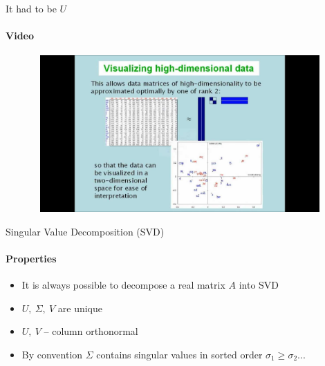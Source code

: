 \documentclass[aspectratio=169]{beamer}
\begin{document}
\begin{frame}[t]{It had to be $U$}  
    \framesubtitle{Video}
    \vspace{-0.6cm}
    \begin{figure}[H]
        \href{https://youtu.be/JEYLfIVvR9I}{
            \centering\includegraphics[height=6cm,width=1\textwidth,keepaspectratio]{svd_song.jpg}}
        \label{fig:file_name}
    \end{figure}
\end{frame}

\begin{frame}[t]{Singular Value Decomposition (SVD)}
\framesubtitle{Properties}
    \LARGE 
    \begin{itemize}
        \item It is always possible to decompose a real matrix $A$ into SVD
        \item $U,\ \Sigma,\ V$ are unique
        \item $U,\ V$ -- column orthonormal
        \item By convention $\Sigma$ contains singular values in sorted order $\sigma_1 \geq \sigma_2 ...$ 
    \end{itemize}
\end{frame}
\end{document}
